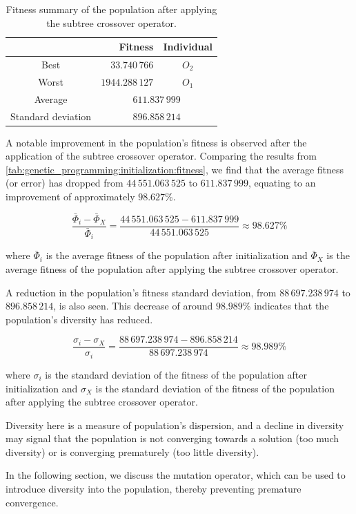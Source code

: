     \begin{table}[H]
      \centering
      \begin{tabular}{|c|r|c|}
        \hline
              & \textbf{Fitness} & \textbf{Individual}  \\
        \hline
        Best  & \(33.740\,766\) & \(O_2\) \\
        Worst & \(1944.288\,127\) & \(O_1\) \\
        \hline
        \hline
        Average & \multicolumn{2}{c|}{\(611.837\,999\)} \\
        \hline
        Standard deviation & \multicolumn{2}{c|}{\(896.858\,214\)} \\
        \hline
      \end{tabular}
      \caption{
        Fitness summary of the population after applying the subtree crossover
        operator.
      }
      \label{tab:bg:gp:variation:crossover:subtree:fitness:summary}
    \end{table}

    A notable improvement in the population's fitness is observed after the 
    application of the subtree crossover operator.
    Comparing the results from 
    \vref{tab:genetic_programming:initialization:fitness}, we find that the 
    average fitness (or error) has dropped from \(44\,551.063\,525\) to 
    \(611.837\,999\), equating to an improvement of approximately \(98.627\%\).

  \[
    \frac{\bar{\Phi}_i - \bar{\Phi}_X}{\bar{\Phi}_i}
     = \frac{44\,551.063\,525 - 611.837\,999}{44\,551.063\,525} \approx 98.627\%
  \]

  where \(\bar{\Phi}_i\) is the average fitness of the population after
  initialization and \(\bar{\Phi}_X\) is the average fitness of the population
  after applying the subtree crossover operator.

  A reduction in the population's fitness standard deviation, from 
  \(88\,697.238\,974\) to \(896.858\,214\), is also seen.
  This decrease of around \(98.989\%\) indicates that the population's diversity
  has reduced.

  \[
    \frac{\sigma_i - \sigma_X}{\sigma_i}
     = \frac{88\,697.238\,974 - 896.858\,214}{88\,697.238\,974} \approx 98.989\%
  \]

  where \(\sigma_i\) is the standard deviation of the fitness of the population
  after initialization and \(\sigma_X\) is the standard deviation of the
  fitness of the population after applying the subtree crossover operator.
  
  Diversity here is a measure of population's dispersion, and a decline in 
  diversity may signal that the population is not converging towards a solution 
  (too much diversity) or is converging prematurely (too little diversity).


  In the following section, we discuss the mutation operator, which can be used 
  to introduce diversity into the population, thereby preventing premature 
  convergence.
